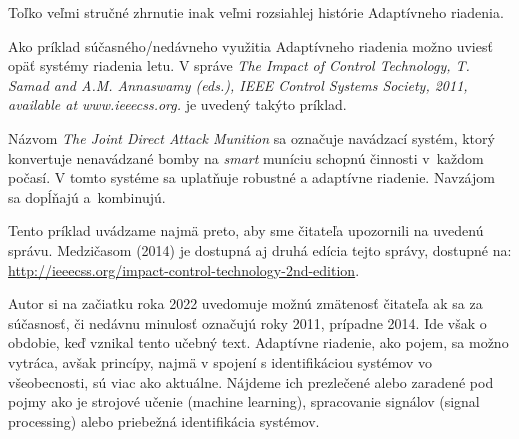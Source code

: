 \documentclass[a4paper, 10pt, ]{article}
\begin{document}
\bigskip

\noindent
Toľko veľmi stručné zhrnutie inak veľmi rozsiahlej histórie Adaptívneho riadenia.

\bigskip

\noindent
Ako príklad súčasného/nedávneho využitia Adaptívneho riadenia možno uviesť opäť systémy riadenia letu. V správe \emph{The Impact of Control Technology, T. Samad and A.M. Annaswamy (eds.), IEEE Control Systems Society, 2011, available at www.ieeecss.org.} je uvedený takýto príklad.

Názvom \emph{The Joint Direct Attack Munition} sa označuje navádzací systém, ktorý konvertuje nenavádzané bomby na \emph{smart} muníciu schopnú činnosti v~každom počasí. V tomto systéme sa uplatňuje robustné a adaptívne riadenie. Navzájom sa dopĺňajú a~kombinujú.

Tento príklad uvádzame najmä preto, aby sme čitateľa upozornili na uvedenú správu. Medzičasom (2014) je dostupná aj druhá edícia tejto správy, dostupné na: \url{http://ieeecss.org/impact-control-technology-2nd-edition}.















\begin{figure}[!t]
	\centering
	\label{Základá schéma adaptívneho riadenia a schéma Gain Scheduling}
\end{figure}








\bigskip

\noindent
Autor si na začiatku roka 2022 uvedomuje možnú zmätenosť čitateľa ak sa za súčasnosť, či nedávnu minulosť označujú roky 2011, prípadne 2014. Ide však o obdobie, keď vznikal tento učebný text. Adaptívne riadenie, ako pojem, sa možno vytráca, avšak princípy, najmä v spojení s identifikáciou systémov vo všeobecnosti, sú viac ako aktuálne. Nájdeme ich prezlečené alebo zaradené pod pojmy ako je strojové učenie (machine learning), spracovanie signálov (signal processing) alebo priebežná identifikácia systémov.
\end{document}
